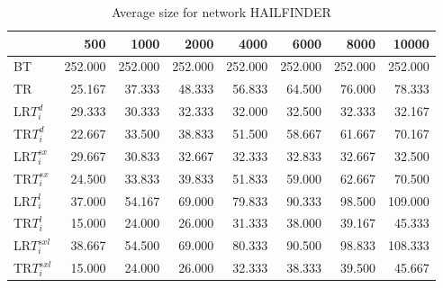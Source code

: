 \begin{table}
\begin{center}
\begin{tabular}{lrrrrrrr}
 & 500 & 1000 & 2000 & 4000 & 6000 & 8000 & 10000\\\hline
BT & 252.000 & 252.000 & 252.000 & 252.000 & 252.000 & 252.000 & 252.000\\\hline
TR & 25.167 & 37.333 & 48.333 & 56.833 & 64.500 & 76.000 & 78.333\\\hline
LR$T_i^d$ & 29.333 & 30.333 & 32.333 & 32.000 & 32.500 & 32.333 & 32.167\\\hline
TR$T_i^d$ & 22.667 & 33.500 & 38.833 & 51.500 & 58.667 & 61.667 & 70.167\\\hline
LR$T_i^{sx}$ & 29.667 & 30.833 & 32.667 & 32.333 & 32.833 & 32.667 & 32.500\\\hline
TR$T_i^{sx}$ & 24.500 & 33.833 & 39.833 & 51.833 & 59.000 & 62.667 & 70.500\\\hline
LR$T_i^l$ & 37.000 & 54.167 & 69.000 & 79.833 & 90.333 & 98.500 & 109.000\\\hline
TR$T_i^l$ & 15.000 & 24.000 & 26.000 & 31.333 & 38.000 & 39.167 & 45.333\\\hline
LR$T_i^{sxl}$ & 38.667 & 54.500 & 69.000 & 80.333 & 90.500 & 98.833 & 108.333\\\hline
TR$T_i^{sxl}$ & 15.000 & 24.000 & 26.000 & 32.333 & 38.333 & 39.500 & 45.667\\\hline
\end{tabular}
\end{center}
\caption{Average size for network HAILFINDER }
\label{Hailfindersi}
\end{table}

